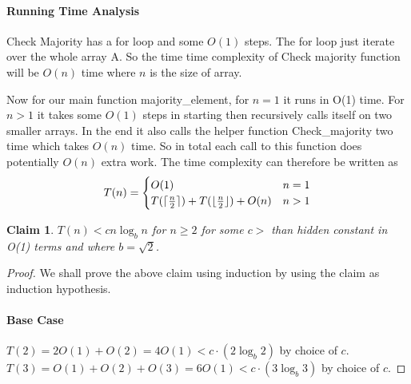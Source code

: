 \documentclass[answers]{exam}
\newtheorem{claim}{Claim}
\begin{document}
\begin{questions}
\begin{parts}
\begin{solution}
\paragraph{Running Time Analysis} Check Majority has a for loop and some $O(1)$ steps. The for loop just iterate over the whole array A. So the time time complexity of Check majority function will be $O(n)$ time where $n$ is the size of array.

Now for our main function majority\_element, for $n=1$ it runs in O(1) time. For $n>1$ it takes some $O(1)$ steps in starting then recursively calls itself on two smaller arrays. In the end it also calls the helper function Check\_majority two time which takes $O(n)$ time. So in total each call to this function does potentially $O(n)$ extra work. The time complexity can therefore be written as  
\[
    T(n) = 
    \begin{cases}
        O(1) & n=1 \\
        T(\lceil\frac{n}{2}\rceil)+ T(\lfloor\frac{n}{2}\rfloor) + O(n) & n > 1 \\
    \end{cases}
\]
\begin{claim}
$T(n) < cn\log_{b}n$ for $n\geq 2$ for some $c > $ than hidden constant in O(1) terms  and where $b=\sqrt{2}$. 
\end{claim}
\begin{proof}
We shall prove the above claim using induction by using the claim as induction hypothesis.

\paragraph{Base Case} $T(2) =2O(1)+O(2)=4O(1) < c \cdot(2\log_b 2) $ by choice of $c$.
\newline $T(3) =O(1)+O(2)+O(3)=6O(1) < c \cdot(3\log_b 3) $ by choice of $c$.

\end{proof}
\end{solution}
\end{parts}
\end{questions}
\end{document}
